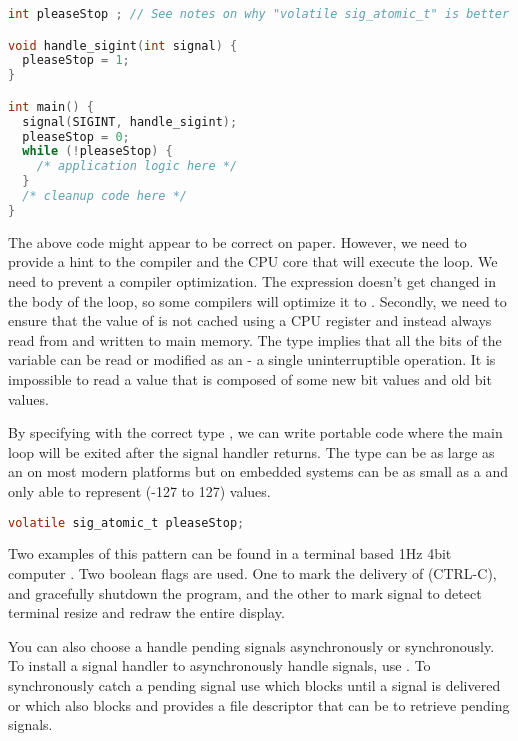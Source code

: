 \begin{lstlisting}[language=C]
int pleaseStop ; // See notes on why "volatile sig_atomic_t" is better

void handle_sigint(int signal) {
  pleaseStop = 1;
}

int main() {
  signal(SIGINT, handle_sigint);
  pleaseStop = 0;
  while (!pleaseStop) {
    /* application logic here */
  }
  /* cleanup code here */
}
\end{lstlisting}

The above code might appear to be correct on paper.
However, we need to provide a hint to the compiler and the CPU core that will execute the  loop.
We need to prevent a compiler optimization.
The expression  doesn't get changed in the body of the loop, so some compilers will optimize it to  .
Secondly, we need to ensure that the value of  is not cached using a CPU register and instead always read from and written to main memory.
The  type implies that all the bits of the variable can be read or modified as an  - a single uninterruptible operation.
It is impossible to read a value that is composed of some new bit values and old bit values.

By specifying  with the correct type , we can write portable code where the main loop will be exited after the signal handler returns.
The  type can be as large as an  on most modern platforms but on embedded systems can be as small as a  and only able to represent (-127 to 127) values.

\begin{lstlisting}[language=C]
volatile sig_atomic_t pleaseStop;
\end{lstlisting}

Two examples of this pattern can be found in  a terminal based 1Hz 4bit computer \cite{Sorn_2015}.
Two boolean flags are used.
One to mark the delivery of  (CTRL-C), and gracefully shutdown the program, and the other to mark  signal to detect terminal resize and redraw the entire display.

You can also choose a handle pending signals asynchronously or synchronously.
To install a signal handler to asynchronously handle signals, use .
To synchronously catch a pending signal use  which blocks until a signal is delivered or  which also blocks and provides a file descriptor that can be  to retrieve pending signals.


